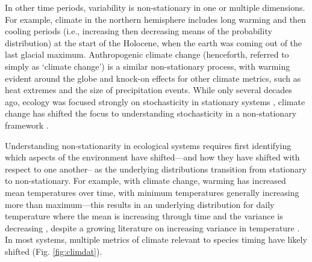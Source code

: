\documentclass[11pt,letterpaper]{article}
\begin{document}
In other time periods, variability is non-stationary in one or multiple dimensions. For example, climate in the northern hemisphere includes long warming and then cooling periods (i.e., increasing then decreasing means of the probability distribution) at the start of the Holocene, when the earth was coming out of the last glacial maximum. Anthropogenic climate change (henceforth, referred to simply as `climate change') is a similar non-stationary process, with warming evident around the globe and knock-on effects for other climate metrics, such as heat extremes and the size of precipitation events. While only several decades ago, ecology was focused strongly on stochasticity in stationary systems \citep[e.g.,][]{Ripa1996,Kaitala1997}, climate change has shifted the focus to understanding stochasticity in a non-stationary framework \citep[e.g.,][]{cazwavelets,ehrlen2016}.

Understanding non-stationarity in ecological systems requires first identifying which aspects of the environment have shifted---and how they have shifted with respect to one another-- as the underlying distributions transition from stationary to non-stationary. For example, with climate change, warming has increased mean temperatures over time, with minimum temperatures generally increasing more than maximum---this results in an underlying distribution for daily temperature where the mean is increasing through time and the variance is decreasing \citep{ipcc2013,screen2014}, despite a growing literature on increasing variance in temperature \citep[e.g.,][]{vasseur2014}. In most systems, multiple metrics of climate relevant to species timing have likely shifted (Fig. \ref{fig:climdat}).
\end{document}
